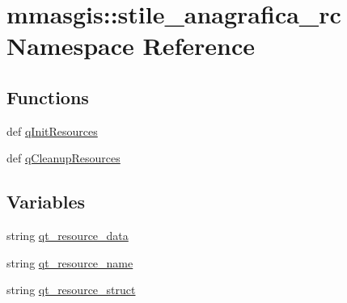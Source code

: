 \hypertarget{namespacemmasgis_1_1stile__anagrafica__rc}{
\section{mmasgis::stile\_\-anagrafica\_\-rc Namespace Reference}
\label{namespacemmasgis_1_1stile__anagrafica__rc}
}
\subsection*{Functions}
\begin{DoxyCompactItemize}
\item 
def \hyperlink{namespacemmasgis_1_1stile__anagrafica__rc_aff93a43cc839f968f8cdc1fca7838288}{qInitResources}
\item 
def \hyperlink{namespacemmasgis_1_1stile__anagrafica__rc_a7f4b7422e17df9392748abd07b563e85}{qCleanupResources}
\end{DoxyCompactItemize}
\subsection*{Variables}
\begin{DoxyCompactItemize}
\item 
string \hyperlink{namespacemmasgis_1_1stile__anagrafica__rc_a0e28eafb2c6e1a90d40c46d05bdd7f8e}{qt\_\-resource\_\-data}
\item 
string \hyperlink{namespacemmasgis_1_1stile__anagrafica__rc_a41d764749853cb44b18b8aec2780f720}{qt\_\-resource\_\-name}
\item 
string \hyperlink{namespacemmasgis_1_1stile__anagrafica__rc_a63205871600a4404f516f399fa44a167}{qt\_\-resource\_\-struct}
\end{DoxyCompactItemize}


